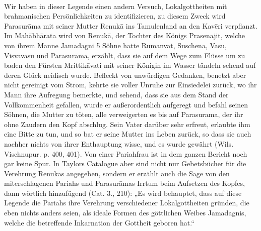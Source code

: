 \documentclass{article}
\begin{document}
\paragraph{}
Wir haben in dieser Legende einen andern Versuch, Lokalgottheiten mit brahmanischen Persönlichkeiten zu identifizieren, zu diesem Zweck wird Parasur\={a}ma mit seiner Mutter Renuk\={a} ins Tamulenland an den Kav\={e}ri verpflanzt. Im Mah\={a}bh\={a}rata wird von Renuk\={a}, der Tochter des Königs Prasenajit, welche von ihrem Manne Jamadagni 5 Söhne hatte Rumanvat, Suschena, Vasu, Visv\={a}vasu und Parasur\={a}ma, erzählt, dass sie auf dem Wege zum Flüsse um zu baden den Fürsten Mrittik\={a}vati mit seiner Königin im Wasser tändeln sehend auf deren Glück neidisch wurde. Befleckt von unwürdigen Gedanken, benetzt aber nicht gereinigt vom Strom, kehrte sie voller Unruhe zur Einsiedelei zurück, wo ihr Mann ihre Aufregung bemerkte, und sehend, dass sie aus dem Stand der Vollkommenheit gefallen, wurde er außerordentlich aufgeregt und befahl seinen Söhnen, die Mutter zu töten, alle verweigerten es bis auf Parasurama, der ihr ohne Zaudern den Kopf abschlug. Sein Vater darüber sehr erfreut, erlaubte ihm eine Bitte zu tun, und so bat er seine Mutter ins Leben zurück, so dass sie auch nachher nichts von ihrer Enthauptung wisse, und es wurde gewährt (Wils. Vischnupur. p. 400, 401). Von einer Pariahfrau ist in dem ganzen Bericht noch gar keine Spur. In Taylors Catalogue aber sind nicht nur Gebetsbücher für die Verehrung Renukas angegeben, sondern er erzählt auch die Sage von den miterschlagenen Pariahs und Parasur\={a}mas Irrtum beim Aufsetzen des Kopfes, dann wörtlich hinzufügend (Cat. 3., 210): „Es wird behauptet, dass auf diese Legende die Pariahs ihre Verehrung verschiedener Lokalgottheiten gründen, die eben nichts anders seien, als ideale Formen des göttlichen Weibes Jamadagnis, welche die betreffende Inkarnation der Gottheit geboren hat.“

\begin{center}
\end{center}
\end{document}
